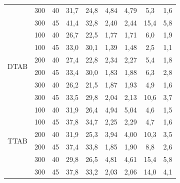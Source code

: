 \begin{table}[h]
{\begin{tabular}{ccccccccc}
        	                      &         300          &   40   &   31,7   &   24,8    &   4,84   &   4,79    &   5,3    &    1,6    \\
        	                      &         300          &   45   &   41,4   &   32,8    &   2,40   &   2,44    &   15,4   &    5,8    \\ \midrule
        	\multirow{6}{*}{DTAB} &         100          &   40   &   26,7   &   22,5    &   1,77   &   1,71    &   6,0    &    1,9    \\
        	                      &         100          &   45   &   33,0   &   30,1    &   1,39   &   1,48    &   2,5    &    1,1    \\
        	                      &         200          &   40   &   27,4   &   22,8    &   2,34   &   2,27    &   5,4    &    1,8    \\
        	                      &         200          &   45   &   33,4   &   30,0    &   1,83   &   1,88    &   6,3    &    2,8    \\
        	                      &         300          &   40   &   26,2   &   21,5    &   1,87   &   1,93    &   4,9    &    1,6    \\
        	                      &         300          &   45   &   33,5   &   29,8    &   2,04   &   2,13    &   10,6   &    3,7    \\ \midrule
        	\multirow{6}{*}{TTAB} &         100          &   40   &   31,9   &   26,4    &   4,94   &   5,04    &   4,6    &    1,5    \\
        	                      &         100          &   45   &   37,8   &   34,7    &   2,25   &   2,29    &   4,7    &    1,6    \\
        	                      &         200          &   40   &   31,9   &   25,3    &   3,94   &   4,00    &   10,3   &    3,5    \\
        	                      &         200          &   45   &   37,4   &   33,8    &   1,85   &   1,90    &   8,8    &    2,6    \\
        	                      &         300          &   40   &   29,8   &   26,5    &   4,81   &   4,61    &   15,4   &    5,8    \\
        	                      &         300          &   45   &   37,8   &   33,2    &   2,03   &   2,06    &   14,0   &    4,1    \\ \bottomrule
        \end{tabular}}%
        {}
    \end{table}
  
